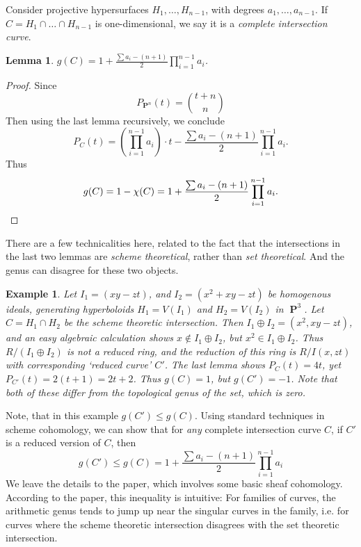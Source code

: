 \documentclass{article}
\theoremstyle{plain}
\newtheorem{lemma}[theorem]{Lemma}
\newtheorem*{example}{Example}
\DeclareMathOperator{\PP}{\mathbf{P}}
\begin{document}
Consider projective hypersurfaces $H_1, \dots, H_{n-1}$, with degrees $a_1, \dots, a_{n-1}$. If $C = H_1 \cap \dots \cap H_{n-1}$ is one-dimensional, we say it is a {\it complete intersection curve}.

\begin{lemma}
    $g(C) = 1 + \frac{\sum a_i - (n + 1)}{2} \prod_{i = 1}^{n-1} a_i$.
\end{lemma}
\begin{proof}
     Since
    \[ P_{\PP^n}(t) = {{t+n} \choose {n}} \]
    Then using the last lemma recursively, we conclude
    \[ P_C(t) = \left( \prod_{i = 1}^{n-1} a_i \right) \cdot t - \frac{\sum a_i - (n + 1)}{2} \prod_{i = 1}^{n-1} a_i. \]
    Thus
    \[ g(C) = 1 - \chi(C) = 1 + \frac{\sum a_i - (n + 1)}{2} \prod_{i = 1}^{n-1} a_i. \qedhere \]
\end{proof}

There are a few technicalities here, related to the fact that the intersections in the last two lemmas are {\it scheme theoretical}, rather than {\it set theoretical}. And the genus can disagree for these two objects.

\begin{example}
    Let $I_1 = (xy-zt)$, and $I_2 = (x^2 + xy - zt)$ be homogenous ideals, generating hyperboloids $H_1 = V(I_1)$ and $H_2 = V(I_2)$ in $\PP^3$. Let $C = H_1 \cap H_2$ be the scheme theoretic intersection. Then $I_1 \oplus I_2 = (x^2, xy - zt)$, and an easy algebraic calculation shows $x \not \in I_1 \oplus I_2$, but $x^2 \in I_1 \oplus I_2$. Thus $R/(I_1 \oplus I_2)$ is not a reduced ring, and the reduction of this ring is $R/I(x,zt)$ with corresponding `reduced curve' $C'$. The last lemma shows $P_C(t) = 4t$, yet $P_{C'}(t) = 2(t+1) = 2t + 2$. Thus $g(C) = 1$, but $g(C') = -1$. Note that both of these differ from the topological genus of the set, which is zero.
\end{example}

 Note, that in this example $g(C') \leq g(C)$. Using standard techniques in scheme cohomology, we can show that for {\it any} complete intersection curve $C$, if $C'$ is a reduced version of $C$, then
 \[ g(C') \leq g(C) = 1 + \frac{\sum a_i - (n+1)}{2} \prod_{i = 1}^{n-1} a_i \]
 We leave the details to the paper, which involves some basic sheaf cohomology. According to the paper, this inequality is intuitive: For families of curves, the arithmetic genus tends to jump up near the singular curves in the family, i.e. for curves where the scheme theoretic intersection disagrees with the set theoretic intersection.
\end{document}
